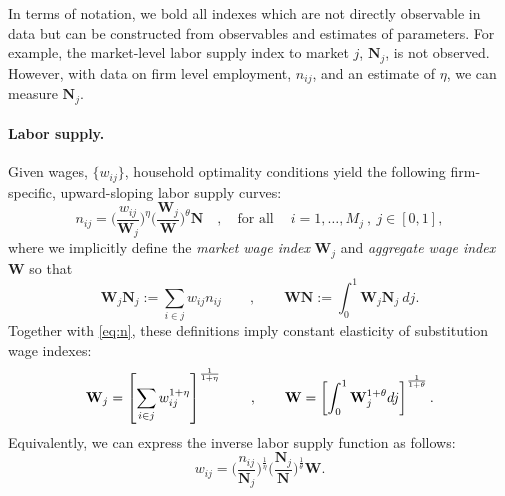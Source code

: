 \documentclass[12pt]{article}
\theoremstyle{prop}
\begin{document}
In terms of notation, we bold all indexes which are not directly observable in data but can be constructed from observables and estimates of parameters.
For example, the market-level labor supply index to market $j$, $\mathbf{N}_{j}$, is not observed. 
However, with data on firm level employment, $n_{ij}$, and an estimate of $\eta$, we can measure $\mathbf{N}_{j}$.

\paragraph{Labor supply.}
Given wages, $\{w_{ij}\}$, household optimality conditions yield the following firm-specific, upward-sloping labor supply curves:
 \begin{equation}\label{eq:n}
	n_{ij} = \Bigg(\frac{w_{ij}}{\textbf{W}_{j}}\Bigg)^\eta\Bigg(\frac{\textbf{W}_{j}}{\textbf{W}}\Bigg)^\theta \textbf{N}\quad,\quad\text{for all}\quad\: i=1,\dots,M_j\:,\: j\in[0,1],
 \end{equation}
where we implicitly define the \emph{market wage index} $\mathbf{W}_{j}$ and \emph{aggregate wage index} $\mathbf{W}$ so that
\begin{equation*}
	\mathbf{W}_{j}\mathbf{N}_{j} := \sum_{i\in j} w_{ij}n_{ij}
	\quad\quad,\quad\quad
	\mathbf{W}\mathbf{N} := \int_0^1 \mathbf{W}_{j}\mathbf{N}_{j}\:dj.
\end{equation*}
Together with \eqref{eq:n}, these definitions imply constant elasticity of substitution  wage indexes:
\vspace*{-.3cm}\begin{equation}\label{eq:Windexes}	
	\mathbf{W}_{j} =  \left[\sum_{i\in j} w_{ij}^{1+\eta}\right]^{\frac{1}{1+\eta}}
	\quad\quad,\quad\quad
	\mathbf{W} =   \left[ \int_0^1 \mathbf{W}_{j}^{1+\theta} dj\right]^{\frac{1}{1+\theta}}.
	\vspace*{-.3cm}\end{equation}
Equivalently, we can express the inverse labor supply function as follows:
 \begin{equation}\label{eq:n_inv}
	w_{ij} = \Bigg(\frac{n_{ij}}{\mathbf{N}_{j}}\Bigg)^\frac{1}{\eta}\Bigg(\frac{\mathbf{N}_{j}}{\mathbf{N}}\Bigg)^\frac{1}{\theta} \textbf{W}.
 \end{equation}
\end{document}

